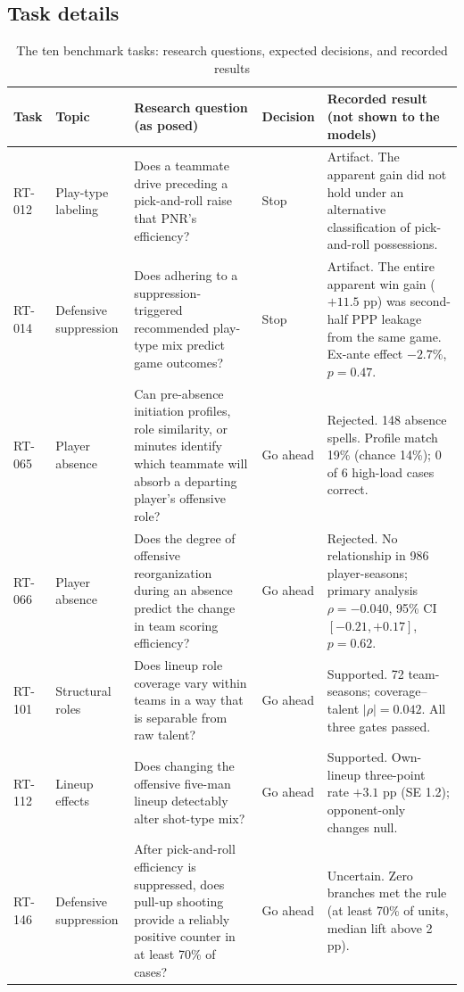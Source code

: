 \documentclass[11pt]{article}
\begin{document}
\subsection{Task details}

\begin{table}[ht]
\centering
\caption{The ten benchmark tasks: research questions, expected decisions, and recorded results}
\label{tab:tasks}
\small
\begin{tabular}{p{0.6cm}p{1.6cm}p{4.4cm}p{1.0cm}p{5.2cm}}
\toprule
Task & Topic & Research question (as posed) & Decision & Recorded result (not shown to the models) \\
\midrule
RT-012 & Play-type labeling & Does a teammate drive preceding a pick-and-roll raise that PNR's efficiency? & Stop & Artifact. The apparent gain did not hold under an alternative classification of pick-and-roll possessions. \\
\addlinespace
RT-014 & Defensive suppression & Does adhering to a suppression-triggered recommended play-type mix predict game outcomes? & Stop & Artifact. The entire apparent win gain ($+11.5$ pp) was second-half PPP leakage from the same game. Ex-ante effect $-2.7\%$, $p = 0.47$. \\
\addlinespace
RT-065 & Player absence & Can pre-absence initiation profiles, role similarity, or minutes identify which teammate will absorb a departing player's offensive role? & Go ahead & Rejected. 148 absence spells. Profile match 19\% (chance 14\%); 0 of 6 high-load cases correct. \\
\addlinespace
RT-066 & Player absence & Does the degree of offensive reorganization during an absence predict the change in team scoring efficiency? & Go ahead & Rejected. No relationship in 986 player-seasons; primary analysis $\rho = -0.040$, 95\% CI $[-0.21, +0.17]$, $p = 0.62$. \\
\addlinespace
RT-101 & Structural roles & Does lineup role coverage vary within teams in a way that is separable from raw talent? & Go ahead & Supported. 72 team-seasons; coverage--talent $|\rho| = 0.042$. All three gates passed. \\
\addlinespace
RT-112 & Lineup effects & Does changing the offensive five-man lineup detectably alter shot-type mix? & Go ahead & Supported. Own-lineup three-point rate $+3.1$ pp (SE 1.2); opponent-only changes null. \\
\addlinespace
RT-146 & Defensive suppression & After pick-and-roll efficiency is suppressed, does pull-up shooting provide a reliably positive counter in at least 70\% of cases? & Go ahead & Uncertain. Zero branches met the rule (at least 70\% of units, median lift above 2 pp). \\

\end{tabular}
\end{table}
\end{document}

